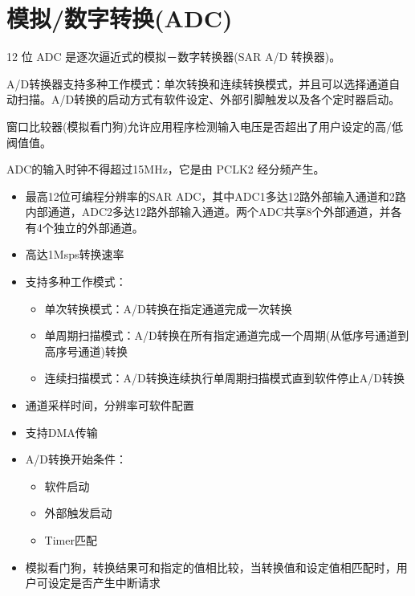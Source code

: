 \def\sectionabstract{模拟/数字转换(ADC) }

\section{模拟/数字转换(ADC)}


12 位 ADC 是逐次逼近式的模拟－数字转换器(SAR A/D 转换器)。\par

A/D转换器支持多种工作模式：单次转换和连续转换模式，并且可以选择通道自动扫描。A/D转换的启动方式有软件设定、外部引脚触发以及各个定时器启动。\par

窗口比较器(模拟看门狗)允许应用程序检测输入电压是否超出了用户设定的高/低阀值值。\par

ADC的输入时钟不得超过15MHz，它是由 PCLK2 经分频产生。\par 


\begin{itemize}


\item{最高12位可编程分辨率的SAR ADC，其中ADC1多达12路外部输入通道和2路内部通道，ADC2多达12路外部输入通道。两个ADC共享8个外部通道，并各有4个独立的外部通道。}


\item{高达1Msps转换速率}
\item{支持多种工作模式：}

\begin{itemize}
	\item{单次转换模式：A/D转换在指定通道完成一次转换}
	\item{单周期扫描模式：A/D转换在所有指定通道完成一个周期(从低序号通道到高序号通道)转换}
	\item{连续扫描模式：A/D转换连续执行单周期扫描模式直到软件停止A/D转换}
\end{itemize}

\item{通道采样时间，分辨率可软件配置}
\item{支持DMA传输}
\item{A/D转换开始条件：}
\begin{itemize}
	\item{软件启动}
	\item{外部触发启动}
	\item{Timer匹配}
\end{itemize}
\item{模拟看门狗，转换结果可和指定的值相比较，当转换值和设定值相匹配时，用户可设定是否产生中断请求}
\end{itemize}

